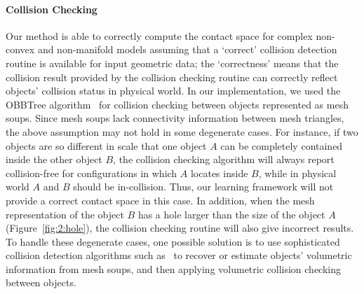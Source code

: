 \paragraph{Collision Checking}
Our method is able to correctly compute the contact space for complex non-convex and non-manifold models assuming that a `correct' collision detection routine is available for input geometric data; the `correctness' means that the collision result provided by the collision checking routine can correctly reflect objects' collision status in physical world. In our implementation, we used the OBBTree algorithm~\cite{Gottschalk:1996:OHS} for collision checking between objects represented as mesh soups. Since mesh soups lack connectivity information between mesh triangles, the above assumption may not hold in some degenerate cases. For instance, if two objects are so different in scale that one object $A$ can be completely contained inside the other object $B$, the collision checking algorithm will always report collision-free for configurations in which $A$ locates inside $B$, while in physical world $A$ and $B$ should be in-collision. Thus, our learning framework will not provide a correct contact space in this case. In addition, when the mesh representation of the object $B$ has a hole larger than the size of the object $A$ (Figure~\ref{fig:2:hole}), the collision checking routine will also give incorrect results. To handle these degenerate cases, one possible solution is to use sophisticated collision detection algorithms such as~\cite{Ju:2004:RRP} to recover or estimate objects' volumetric information from mesh soups, and then applying volumetric collision checking between objects.

